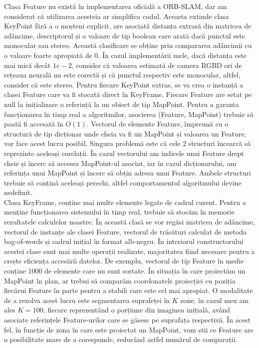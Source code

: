 \documentclass[12pt,a4paper]{report}
\begin{document}
Clasa Feature nu există în implementarea oficială a ORB-SLAM, dar am considerat 
că utilizarea acesteia ar simplifica codul. Aceasta extinde clasa KeyPoint fără a o moșteni explicit,
are asociată distanța extrasă din matricea de adâncime, descriptorul
și o valoare de tip boolean care arată dacă punctul este monocular sau stereo. Această clasificare
se obține prin compararea adâncimii cu o valoare foarte apropiată de 0. În cazul implementării mele,
dacă distanța este mai mică decât $ 1e-2 $, consider că valoarea estimată de camera RGBD ori de rețeaua
neurală nu este corectă și că punctul respectiv este monocular, altfel, consider că este stereo. Pentru
fiecare KeyPoint extras, se va crea o instanță a clasei Feature care va fi stocată direct în KeyFrame. 
Fiecare Feature are setat pe null la inițializare o referință la un obiect de tip MapPoint. Pentru a
garanta funcționarea în timp real a algoritmilor, asocierea (Feature, MapPoint) trebuie să poată fi accesată
în $ O(1) $. Vectorul de elemente Feature, împreună cu o structură de tip dicționar unde cheia va fi un MapPoint
și valoarea un Feature, vor face acest lucru posibil. Singura problemă este că cele 2 structuri încearcă să 
reprezinte aceleași corelații. În cazul vectorului am indicele unui Feature drept cheie și încerc
să accesez MapPoint-ul asociat, iar în cazul dicționarului, am referința unui MapPoint și încerc să
obțin adresa unui Feature. Ambele structuri trebuie să conțină aceleași perechi, altfel comportamentul 
algoritmului devine nedefinit. \\

Clasa KeyFrame, conține mai multe elemente legate de cadrul curent. Pentru a menține 
funcționarea sistemului în timp real, trebuie să stocăm în memorie rezultatele calculelor noastre.
În această clasă se vor regăsi matricea de adâncime, vectorul de instanțe ale clasei Feature,
vectorul de trăsături calculat de metoda bag-of-words și cadrul inițial în format alb-negru. 
În interiorul constructorului acestei clase sunt mai multe operații realizate, majoritatea fiind necesare
pentru a crește eficiența accesării datelor. De exemplu, vectorul de tip Feature
în medie conține 1000 de elemente care nu sunt sortate. În situația în care proiectăm un MapPoint în 
plan, ar trebui să comparăm coordonatele proiecției cu poziția fiecărui Feature în parte pentru a 
stabili care este cel mai apropiat. O modalitate de a rezolva acest lucru este segmentarea suprafeței
în \(K\) zone, în cazul meu am ales $ K = 100$, fiecare reprezentând o porțiune din imaginea inițială,
având asociate referințele Feature-urilor care se găsesc pe suprafața respectivă. În acest fel,
în funcție de zona în care este proiectat un MapPoint, vom știi ce Feature are o posibilitate
mare de a corespunde, reducând astfel numărul de comparații.
\end{document}
